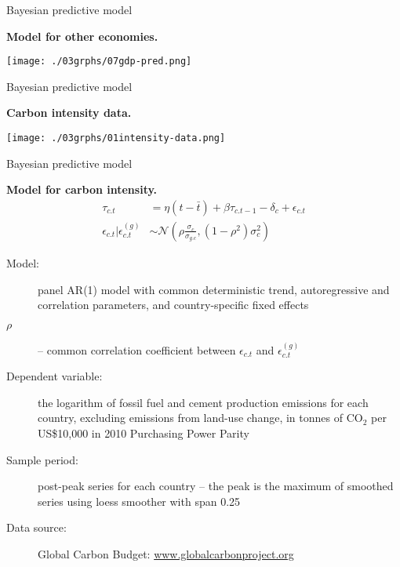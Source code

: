 \documentclass[notes,blackandwhite,mathsans,usenames,dvipsnames]{beamer}
\begin{document}
\begin{frame}{Bayesian predictive model}

\textbf{Model for other economies.}
\begin{center}
\texttt{[image: ./03grphs/07gdp-pred.png]}
\end{center}
\end{frame}




\begin{frame}{Bayesian predictive model}

\bigskip\textbf{Carbon intensity data.}
\begin{center}
\texttt{[image: ./03grphs/01intensity-data.png]}
\end{center}
\end{frame}



\begin{frame}{Bayesian  predictive model}

\smallskip\textbf{Model for carbon intensity.}
\begin{align*}
\tau_{c.t} &= \eta (t-\bar{t}) + \beta \tau_{c.t-1} - \delta_{c} + \epsilon_{c.t}\\
\epsilon_{c.t}|\epsilon_{c.t}^{(g)} &\sim\mathcal{N}\left( \rho\frac{\sigma_{c}}{\sigma_{g.c}},(1-\rho^2)\sigma_{c}^2 \right)
\end{align*}

\smallskip\small\begin{description}
\item[Model:] panel AR(1) model with common deterministic trend, autoregressive and correlation parameters, and country-specific fixed effects

\item[$\rho$] -- common correlation coefficient between $\epsilon_{c.t}$ and $\epsilon_{c.t}^{(g)}$

\smallskip\item[Dependent variable:] 

the logarithm of fossil fuel and cement production emissions for each country, excluding emissions from land-use change, in tonnes of CO$_2$ per US\$10,000 in 2010
Purchasing Power Parity

\item[Sample period:] post-peak series for each country -- the peak is the maximum of smoothed series using loess smoother with span 0.25

\item[Data source:] Global Carbon Budget: \href{https://www.globalcarbonproject.org/}{www.globalcarbonproject.org}

\end{description}

\end{frame}
\end{document}
